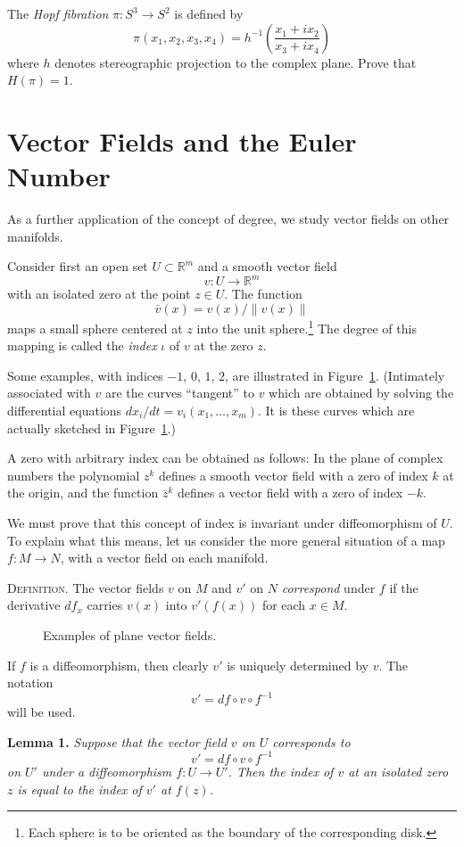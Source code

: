 The \emph{Hopf fibration} $\pi : S^3 \to S^2$ is defined by
\[
\pi(x_1, x_2, x_3, x_4) = h^{-1}\!\left(\frac{x_1 + i x_2}{x_3 + i x_4}\right)
\]
where $h$ denotes stereographic projection to the complex plane. Prove that $H(\pi) = 1$.



\section{Vector Fields and the Euler Number}

As a further application of the concept of degree, we study vector fields on other manifolds.

Consider first an open set $U \subset \mathbb{R}^m$ and a smooth vector field
\[
v : U \to \mathbb{R}^m
\]
with an isolated zero at the point $z \in U$. The function
\[
\bar{v}(x) = v(x) / \|v(x)\|
\]
maps a small sphere centered at $z$ into the unit sphere.\footnote{Each sphere is to be oriented as the boundary of the corresponding disk.} The degree of this mapping is called the \emph{index} $\iota$ of $v$ at the zero $z$.

Some examples, with indices $-1$, $0$, $1$, $2$, are illustrated in Figure~\ref{fig:milnor-12}. (Intimately associated with $v$ are the curves ``tangent'' to $v$ which are obtained by solving the differential equations $dx_i/dt = v_i(x_1, \ldots, x_m)$. It is these curves which are actually sketched in Figure~\ref{fig:milnor-12}.)

A zero with arbitrary index can be obtained as follows: In the plane of complex numbers the polynomial $z^k$ defines a smooth vector field with a zero of index $k$ at the origin, and the function $\bar{z}^k$ defines a vector field with a zero of index $-k$.

We must prove that this concept of index is invariant under diffeomorphism of $U$. To explain what this means, let us consider the more general situation of a map $f : M \to N$, with a vector field on each manifold.

\textsc{Definition.} The vector fields $v$ on $M$ and $v'$ on $N$ \emph{correspond} under $f$ if the derivative $df_x$ carries $v(x)$ into $v'(f(x))$ for each $x \in M$.



\begin{figure}[htbp]
\centering
\setcounter{figure}{11}%
\caption{Examples of plane vector fields.}\label{fig:milnor-12}
\end{figure}

If $f$ is a diffeomorphism, then clearly $v'$ is uniquely determined by $v$. The notation
\[
v' = df \circ v \circ f^{-1}
\]
will be used.

\noindent\textbf{Lemma 1.} \textit{Suppose that the vector field $v$ on $U$ corresponds to}
\[
v' = df \circ v \circ f^{-1}
\]
\textit{on $U'$ under a diffeomorphism $f : U \to U'$. Then the index of $v$ at an isolated zero $z$ is equal to the index of $v'$ at $f(z)$.}

